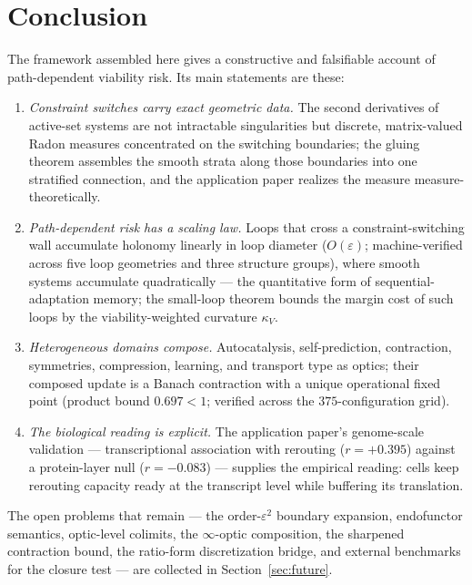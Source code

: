 \documentclass[11pt,a4paper]{article}
\theoremstyle{plain}
\theoremstyle{definition}
\theoremstyle{remark}
\newcommand{\kk}{\kappa_{\!V}}
\begin{document}

\section{Conclusion}\label{sec:conclusion}

The framework assembled here gives a constructive and falsifiable
account of path-dependent viability risk. Its main statements are
these:
\begin{enumerate}[leftmargin=*,itemsep=2pt]
\item \emph{Constraint switches carry exact geometric data.} The
second derivatives of active-set systems are not intractable
singularities but discrete, matrix-valued Radon measures concentrated
on the switching boundaries; the gluing theorem assembles the smooth
strata along those boundaries into one stratified connection, and
the application paper \citep{zai2026measure} realizes the measure
measure-theoretically.
\item \emph{Path-dependent risk has a scaling law.} Loops that cross
a constraint-switching wall accumulate holonomy linearly in loop
diameter ($O(\varepsilon)$; machine-verified across five loop
geometries and three structure groups), where smooth systems
accumulate quadratically --- the quantitative form of sequential-
adaptation memory; the small-loop theorem bounds the margin cost of
such loops by the viability-weighted curvature $\kk$.
\item \emph{Heterogeneous domains compose.} Autocatalysis,
self-prediction, contraction, symmetries, compression, learning, and
transport type as optics; their composed update is a Banach
contraction with a unique operational fixed point (product bound
$0.697 < 1$; verified across the $375$-configuration grid).
\item \emph{The biological reading is explicit.} The application
paper's genome-scale validation --- transcriptional association with
rerouting ($r = +0.395$) against a protein-layer null
($r = -0.083$) --- supplies the empirical reading: cells keep
rerouting capacity ready at the transcript level while buffering its
translation.
\end{enumerate}
The open problems that remain --- the order-$\varepsilon^2$
boundary expansion, endofunctor semantics, optic-level colimits, the
$\infty$-optic composition, the sharpened contraction bound, the
ratio-form discretization bridge, and external benchmarks for the
closure test --- are collected in Section~\ref{sec:future}.
\end{document}
